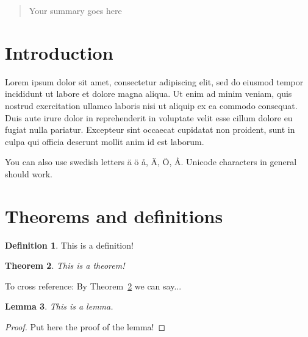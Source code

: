 \documentclass[12pt, a4paper, twoside]{article}
\theoremstyle{definition}
\newtheorem{definition}{Definition}[section]
\theoremstyle{plain}
\newtheorem{theorem}[definition]{Theorem}
\newtheorem{lemma}[definition]{Lemma}
\theoremstyle{remark}
\begin{document}
\setlength{\voffset}{0cm}
\setlength{\hoffset}{0cm}

\setlength{\voffset}{-2.54cm}
\setlength{\hoffset}{-2.54cm}



\clearpage{\thispagestyle{empty}\cleardoublepage}

\begin{abstract}
    Your summary goes here
\end{abstract}

\clearpage{\thispagestyle{empty}\cleardoublepage}
{\hypersetup{linkcolor=black}
\tableofcontents
}

\clearpage{\thispagestyle{empty}\cleardoublepage}
\section{Introduction}

Lorem ipsum dolor sit amet, consectetur adipiscing elit, sed do eiusmod tempor incididunt ut labore et dolore magna aliqua.
Ut enim ad minim veniam, quis nostrud exercitation ullamco laboris nisi ut aliquip ex ea commodo consequat. 
Duis aute irure dolor in reprehenderit in voluptate velit esse cillum dolore eu fugiat nulla pariatur. 
Excepteur sint occaecat cupidatat non proident, sunt in culpa qui officia deserunt mollit anim id est laborum.

You can also use swedish letters ä ö å, Ä, Ö, Å. Unicode characters in general should work.


\clearpage{\thispagestyle{empty}\cleardoublepage}
\section{Theorems and definitions}

\begin{definition}
This is a definition!
\end{definition}

\begin{theorem}\label{thm: label}
This is a theorem!
\end{theorem}

To cross reference: By Theorem~\ref{thm: label} we can say...
\begin{lemma}
This is a lemma.
\end{lemma}
\begin{proof}
Put here the proof of the lemma!
\end{proof}
\end{document}
